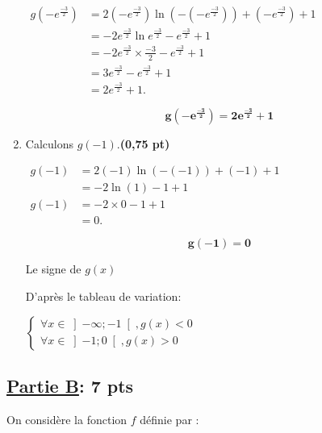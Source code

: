 \documentclass[12pt,a4paper]{article}
\begin{document}
\begin{enumerate}
\(
\begin{aligned}
g(-e^{\frac{-3}{2}}) &= 2(-e^{\frac{-3}{2}}) \ln(-(-e^{\frac{-3}{2}})) + (-e^{\frac{-3}{2}}) + 1 \\
&= -2e^{\frac{-3}{2}} \ln e^{\frac{-3}{2}} - e^{\frac{-3}{2}} + 1\\
&= -2e^{\frac{-3}{2}} \times \frac{-3}{2} - e^{\frac{-3}{2}} + 1 \\
&= 3e^{\frac{-3}{2}} - e^{\frac{-3}{2}} + 1 \\
&= 2e^{\frac{-3}{2}} + 1.
\end{aligned}
\)

          \begin{resultbox}
              \[
                  \mathbf{g(-e^{\frac{-3}{2}})=2e^{\frac{-3}{2}} + 1}
              \]
          \end{resultbox}        
        
          \item Calculons \( g(-1) \).\hfill \textbf{(0,75 pt)}
          
\(
\begin{aligned}
g(-1) &= 2(-1) \ln(-(-1)) + (-1) + 1 \\
&= -2 \ln(1) - 1 + 1\\
g(-1) &= -2 \times 0 - 1 + 1 \\
&= 0.
\end{aligned}
\)

          \begin{resultbox}
              \[
                  \mathbf{g(-1)=0}
              \]
          \end{resultbox} 

Le signe de \( g(x) \)

D'après le tableau de variation:

          \(
            \begin{cases}
              \forall x \in \left]-\infty;-1\right[, g(x)<0  \\
              \forall x \in \left]-1;0\right[, g(x)>0       
          \end{cases} 
          \)
\end{enumerate}

\subsection*{\underline{\textbf{Partie B}}:\textbf{ 7 pts}}

On considère la fonction \( f \) définie par :
\end{document}
